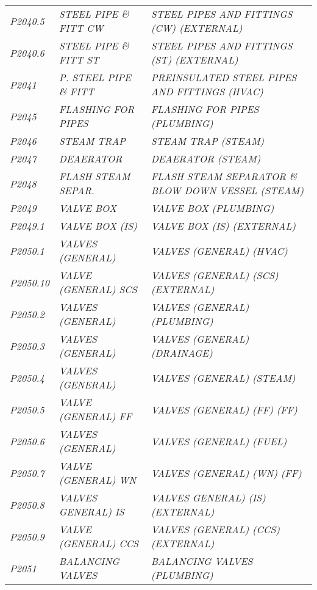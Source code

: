 \begin{landscape}
\begin{longtable}[l]{l%
                  l|%
                  l|}
\itshape P2040.5     &\itshape STEEL PIPE \& FITT CW   &\itshape STEEL PIPES AND FITTINGS (CW) (EXTERNAL)   \\
\itshape P2040.6     &\itshape STEEL PIPE \& FITT ST   &\itshape STEEL PIPES AND FITTINGS  (ST) (EXTERNAL)   \\
\itshape P2041       &\itshape P. STEEL PIPE \& FITT   &\itshape PREINSULATED STEEL PIPES AND FITTINGS (HVAC)   \\
\itshape P2045       &\itshape FLASHING FOR PIPES   &\itshape FLASHING FOR PIPES (PLUMBING)   \\
\itshape P2046       &\itshape STEAM TRAP   &\itshape STEAM TRAP (STEAM)   \\
\itshape P2047       &\itshape DEAERATOR   &\itshape DEAERATOR (STEAM)   \\
\itshape P2048       &\itshape FLASH STEAM SEPAR.   &\itshape FLASH STEAM SEPARATOR \& BLOW DOWN VESSEL (STEAM)   \\
\itshape P2049       &\itshape VALVE BOX   &\itshape VALVE BOX (PLUMBING)   \\
\itshape P2049.1     &\itshape VALVE BOX (IS)   &\itshape VALVE BOX (IS) (EXTERNAL)   \\
\itshape P2050.1     &\itshape VALVES (GENERAL)   &\itshape VALVES (GENERAL) (HVAC)   \\
\itshape P2050.10    &\itshape VALVE (GENERAL) SCS   &\itshape VALVES (GENERAL) (SCS) (EXTERNAL)   \\
\itshape P2050.2     &\itshape VALVES (GENERAL)   &\itshape VALVES (GENERAL) (PLUMBING)   \\
\itshape P2050.3     &\itshape VALVES (GENERAL)   &\itshape VALVES (GENERAL) (DRAINAGE)   \\
\itshape P2050.4     &\itshape VALVES (GENERAL)   &\itshape VALVES (GENERAL) (STEAM)   \\
\itshape P2050.5     &\itshape VALVE (GENERAL) FF   &\itshape VALVES (GENERAL) (FF) (FF)   \\
\itshape P2050.6     &\itshape VALVES (GENERAL)   &\itshape VALVES (GENERAL)  (FUEL)   \\
\itshape P2050.7     &\itshape VALVE (GENERAL) WN   &\itshape VALVES (GENERAL) (WN) (FF)   \\
\itshape P2050.8     &\itshape VALVES GENERAL) IS   &\itshape VALVES GENERAL) (IS) (EXTERNAL)   \\
\itshape P2050.9     &\itshape VALVE (GENERAL) CCS   &\itshape VALVES (GENERAL) (CCS) (EXTERNAL)   \\
\itshape P2051       &\itshape BALANCING VALVES   &\itshape BALANCING VALVES (PLUMBING)   \\

\end{longtable}
\end{landscape}
